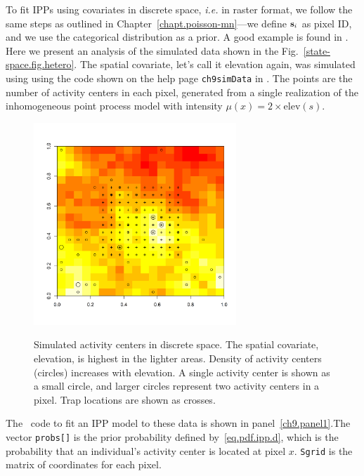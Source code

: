 To fit IPPs using covariates in discrete space, \emph{i.e.} in raster
format, we follow the same steps
as outlined in Chapter~\ref{chapt.poisson-mn}---we define ${\bf s}_i$ as
pixel ID, and we use the categorical distribution as a prior. A good
example is found in \citep{mollet_etal:2012}. Here we present
an analysis of the simulated data shown in the %
Fig.~\ref{state-space.fig.hetero}. The spatial covariate, let's call it
elevation again, was simulated
using using the code shown on the help page
\verb+ch9simData+ in \scrbook. The points are the number of
activity centers in each pixel, generated from a single realization of
the inhomogeneous point process model with intensity
$\mu(x) = 2 \times \mbox{elev}(s)$.
\begin{figure}[ht]
\centering
\includegraphics[width=3in,height=3in]{Ch11/figs/discrete}
\label{ch9.fig.discrete}
\caption{Simulated activity centers in discrete space. The spatial
  covariate, elevation, is highest in the lighter areas. Density of
  activity centers (circles) increases with elevation. A single
  activity center is shown as a small circle, and larger circles
  represent two activity centers in a pixel. Trap locations
  are shown as crosses.}
\end{figure}

The \bugs~code to fit an IPP model to these data is shown in
panel~\ref{ch9.panel1}.The vector \verb+probs[]+ is the prior
probability defined
by~\ref{eq.pdf.ipp.d}, which is the probability that an individual's
activity center is located at pixel $x$. \verb+Sgrid+ is the
matrix of coordinates for each pixel.


